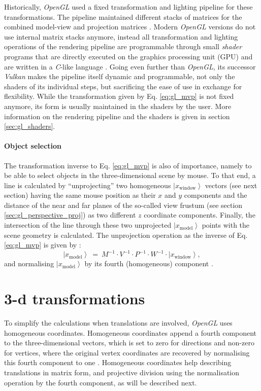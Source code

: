 Historically, \textit{OpenGL} used a fixed transformation and lighting pipeline \cite{wiki_gl_history} for
these transformations. The pipeline maintained different stacks of matrices for the combined model-view and
projection matrices \cite{web_gl_matrixmode}.
Modern \textit{OpenGL} \cite{web_OpenGL} versions do not use internal matrix stacks anymore, instead all
transformation and lighting operations of the rendering pipeline are programmable through small \textit{shader}
programs that are directly executed on the graphics processing unit (GPU) \cite{wiki_gl_history}
and are written in a \textit{C}-like language \cite{wiki_glsl}.
Going even further than \textit{OpenGL}, its successor \textit{Vulkan} \cite{web_Vulkan} makes the pipeline
itself dynamic and programmable, not only the shaders of its individual steps, but sacrificing the ease of use in 
exchange for flexibility.
While the transformation given by Eq. \ref{eq:gl_mvp} is not fixed anymore, its form is usually maintained
in the shaders by the user. More information on the rendering pipeline and the shaders is given in 
section \ref{sec:gl_shaders}.

\paragraph{Object selection}
The transformation inverse to Eq. \ref{eq:gl_mvp} is also of importance, namely to be able to select objects in the
three-dimensional scene by mouse. 
To that end, a line is calculated by ``unprojecting'' two homogeneous $\left|x_{\mathrm{window}}\right>$ vectors
(see next section) having the same mouse position as their $x$ and $y$ components and the distance of the
near and far planes of the so-called view frustum (see section \ref{sec:gl_perspective_proj})
as two different $z$ coordinate components.
Finally, the intersection of the line through these two unprojected $\left|x_{\mathrm{model}}\right>$ points 
with the scene geometry is calculated. 
The unprojection operation as the inverse of Eq. \ref{eq:gl_mvp} is given by \cite{web_gl_unproject}:
\begin{equation}
	\left|x_{\mathrm{model}}\right> \ =\ M^{-1} \cdot V^{-1} \cdot P^{-1} \cdot  W^{-1} \cdot  \left| x_{\mathrm{window}} \right>,
\end{equation}
and normalising $\left|x_{\mathrm{model}}\right>$ by its fourth (homogeneous) component \cite{web_gl_unproject}.



\section{3-d transformations}
\label{sec:gl_trafos}
To simplify the calculations when translations are involved, \textit{OpenGL} uses homogeneous coordinates.
Homogeneous coordinates append a fourth component to the three-dimensional vectors, which is set to zero for
directions and non-zero for vertices, where the original vertex coordinates are recovered by normalising this
fourth component to one \cite[pp. 235, 357]{Bronstein2008}. Homogeneous coordinates help describing translations
in matrix form, and projective division using the normalisation operation by the fourth component, as will be
described next.


